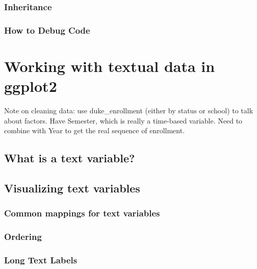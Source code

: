 \documentclass[
]{krantz}
\begin{document}
\hypertarget{inheritance}{%
\subsection{Inheritance}\label{inheritance}}

\hypertarget{how-to-debug-code}{%
\subsection{How to Debug Code}\label{how-to-debug-code}}

\hypertarget{text-data-visualizations}{%
\chapter{Working with textual data in ggplot2}\label{text-data-visualizations}}

Note on cleaning data: use duke\_enrollment (either by status or school) to talk about factors.
Have Semester, which is really a time-based variable. Need to combine with Year
to get the real sequence of enrollment.

\hypertarget{what-is-a-text-variable}{%
\section{What is a text variable?}\label{what-is-a-text-variable}}

\hypertarget{visualizing-text-variables}{%
\section{Visualizing text variables}\label{visualizing-text-variables}}

\hypertarget{common-mappings-for-text-variables}{%
\subsection{Common mappings for text variables}\label{common-mappings-for-text-variables}}

\hypertarget{ordering}{%
\subsection{Ordering}\label{ordering}}

\hypertarget{long-text-labels}{%
\subsection{Long Text Labels}\label{long-text-labels}}
\end{document}
